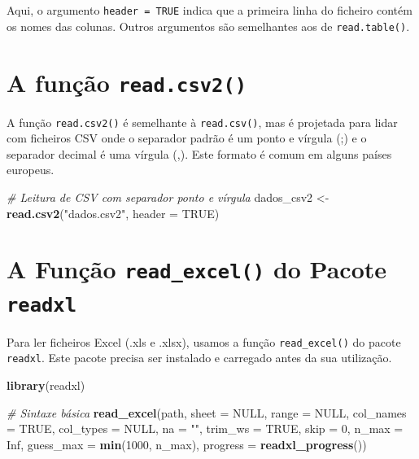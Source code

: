 \documentclass[
]{book}
\newenvironment{Shaded}{\begin{snugshade}}{\end{snugshade}}
\newcommand{\AttributeTok}[1]{\textcolor[rgb]{0.13,0.29,0.53}{#1}}
\newcommand{\CommentTok}[1]{\textcolor[rgb]{0.56,0.35,0.01}{\textit{#1}}}
\newcommand{\ConstantTok}[1]{\textcolor[rgb]{0.56,0.35,0.01}{#1}}
\newcommand{\DecValTok}[1]{\textcolor[rgb]{0.00,0.00,0.81}{#1}}
\newcommand{\FunctionTok}[1]{\textcolor[rgb]{0.13,0.29,0.53}{\textbf{#1}}}
\newcommand{\NormalTok}[1]{#1}
\newcommand{\OtherTok}[1]{\textcolor[rgb]{0.56,0.35,0.01}{#1}}
\newcommand{\StringTok}[1]{\textcolor[rgb]{0.31,0.60,0.02}{#1}}
\begin{document}
Aqui, o argumento \texttt{header\ =\ TRUE} indica que a primeira linha do
ficheiro contém os nomes das colunas. Outros argumentos são semelhantes
aos de \texttt{read.table()}.

\section{\texorpdfstring{A função \texttt{read.csv2()}}{A função read.csv2()}}\label{a-funuxe7uxe3o-read.csv2}

A função \texttt{read.csv2()} é semelhante à \texttt{read.csv()}, mas é projetada para
lidar com ficheiros CSV onde o separador padrão é um ponto e vírgula (;)
e o separador decimal é uma vírgula (,). Este formato é comum em alguns
países europeus.

\begin{Shaded}
\begin{Highlighting}[]
\CommentTok{\# Leitura de CSV com separador ponto e vírgula}
\NormalTok{dados\_csv2 }\OtherTok{\textless{}{-}} \FunctionTok{read.csv2}\NormalTok{(}\StringTok{"dados.csv2"}\NormalTok{, }\AttributeTok{header =} \ConstantTok{TRUE}\NormalTok{)}
\end{Highlighting}
\end{Shaded}

\section{\texorpdfstring{A Função \texttt{read\_excel()} do Pacote \texttt{readxl}}{A Função read\_excel() do Pacote readxl}}\label{a-funuxe7uxe3o-read_excel-do-pacote-readxl}

Para ler ficheiros Excel (.xls e .xlsx), usamos a função \texttt{read\_excel()}
do pacote \texttt{readxl}. Este pacote precisa ser instalado e carregado antes
da sua utilização.

\begin{Shaded}
\begin{Highlighting}[]
\FunctionTok{library}\NormalTok{(readxl)}

\CommentTok{\# Sintaxe básica}
\FunctionTok{read\_excel}\NormalTok{(path, }\AttributeTok{sheet =} \ConstantTok{NULL}\NormalTok{, }\AttributeTok{range =} \ConstantTok{NULL}\NormalTok{, }\AttributeTok{col\_names =} \ConstantTok{TRUE}\NormalTok{,}
           \AttributeTok{col\_types =} \ConstantTok{NULL}\NormalTok{, }\AttributeTok{na =} \StringTok{""}\NormalTok{, }\AttributeTok{trim\_ws =} \ConstantTok{TRUE}\NormalTok{, }\AttributeTok{skip =} \DecValTok{0}\NormalTok{, }\AttributeTok{n\_max =} \ConstantTok{Inf}\NormalTok{,}
           \AttributeTok{guess\_max =} \FunctionTok{min}\NormalTok{(}\DecValTok{1000}\NormalTok{, n\_max), }\AttributeTok{progress =} \FunctionTok{readxl\_progress}\NormalTok{())}
\end{Highlighting}
\end{Shaded}
\end{document}
